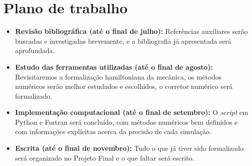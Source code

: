 \section{Plano de trabalho}

\begin{itemize}
    \item \textbf{Revisão bibliográfica (até o final de julho):} Referências auxiliares serão buscadas e investigadas brevemente, e a bibliografia já apresentada será aprofundada.

    \item \textbf{Estudo das ferramentas utilizadas (até o final de agosto):} Revisitaremos a formalização hamiltoniana da mecânica, os métodos numéricos serão melhor estudados e escolhidos, o corretor numérico será formalizado.

    \item \textbf{Implementação computacional (até o final de setembro):} O \textit{script} em Python e Fortran será concluído, com métodos numéricos bem definidos e com informações explícitas acerca da precisão de cada simulação.

    \item \textbf{Escrita (até o final de novembro):} Tudo o que já tiver sido formalizado será organizado no Projeto Final e o que faltar será escrito.
\end{itemize}